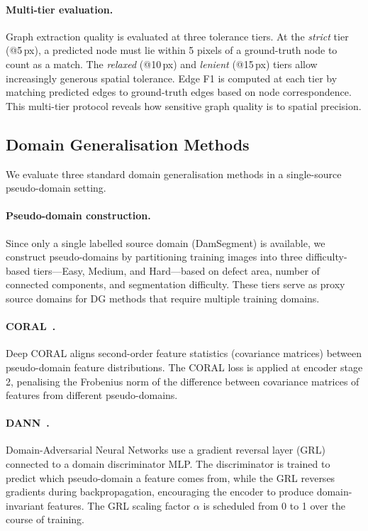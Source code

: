 \documentclass[preprint,12pt]{elsarticle}
\begin{document}
\paragraph{Multi-tier evaluation.}
Graph extraction quality is evaluated at three tolerance tiers. At the \emph{strict} tier (@5\,px), a predicted node must lie within 5 pixels of a ground-truth node to count as a match. The \emph{relaxed} (@10\,px) and \emph{lenient} (@15\,px) tiers allow increasingly generous spatial tolerance. Edge F1 is computed at each tier by matching predicted edges to ground-truth edges based on node correspondence. This multi-tier protocol reveals how sensitive graph quality is to spatial precision.

\subsection{Domain Generalisation Methods}
\label{sec:dg_methods}

We evaluate three standard domain generalisation methods in a single-source pseudo-domain setting.

\paragraph{Pseudo-domain construction.}
Since only a single labelled source domain (DamSegment) is available, we construct pseudo-domains by partitioning training images into three difficulty-based tiers---Easy, Medium, and Hard---based on defect area, number of connected components, and segmentation difficulty. These tiers serve as proxy source domains for DG methods that require multiple training domains.

\paragraph{CORAL~\cite{sun2016coral}.}
Deep CORAL aligns second-order feature statistics (covariance matrices) between pseudo-domain feature distributions. The CORAL loss is applied at encoder stage 2, penalising the Frobenius norm of the difference between covariance matrices of features from different pseudo-domains.

\paragraph{DANN~\cite{ganin2016dann}.}
Domain-Adversarial Neural Networks use a gradient reversal layer (GRL) connected to a domain discriminator MLP. The discriminator is trained to predict which pseudo-domain a feature comes from, while the GRL reverses gradients during backpropagation, encouraging the encoder to produce domain-invariant features. The GRL scaling factor $\alpha$ is scheduled from 0 to 1 over the course of training.
\end{document}

